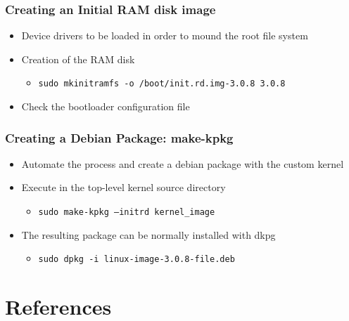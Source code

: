 \documentclass{beamer}
\begin{document}
\begin{frame}
\frametitle{Creating an Initial RAM disk image}
 
\begin{itemize}

   \item Device drivers to be loaded in order to mound the root file system
   \item Creation of the RAM disk
      \begin{itemize}
      \item \texttt{sudo mkinitramfs -o /boot/init.rd.img-3.0.8 3.0.8}
      \end{itemize}
   \item Check the bootloader configuration file

\end{itemize}

\end{frame}


\begin{frame}
\frametitle{Creating a Debian Package: make-kpkg}
 
\begin{itemize}
   \item Automate the process and create a debian package with the custom kernel
   \item Execute in the top-level kernel source directory 
      \begin{itemize}
      \item \texttt{sudo make-kpkg --initrd kernel\_image}
      \end{itemize}
   \item The resulting package can be normally installed with dkpg
      \begin{itemize}
      \item \texttt{sudo dpkg -i linux-image-3.0.8-file.deb} 
      \end{itemize}

\end{itemize}

\end{frame}

\section{References}
\end{document}
